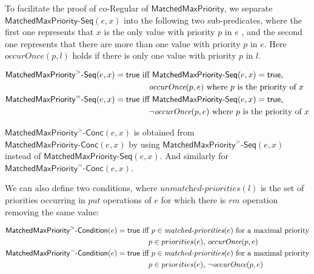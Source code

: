 To facilitate the proof of co-Regular of $\mathsf{MatchedMaxPriority}$, we separate $\mathsf{MatchedMaxPriority\text{-}Seq}(e,x)$ into the following two sub-predicates, where the first one represents that $x$ is the only value with priority $p$ in $e$ , and the second one represents that there are more than one value with priority $p$ in $e$. Here $\textit{occurOnce}(p,l)$ holds if there is only one value with priority $p$ in $l$. 

{\small
\begin{align*}
\mathsf{MatchedMaxPriority}^{>}\mathsf{\text{-}Seq}(e,x)=\mathsf{true} & \mbox{ iff  $\mathsf{MatchedMaxPriority}\mathsf{\text{-}Seq}(e,x)=\mathsf{true}$,} \\
&\hspace{4mm}\mbox{$\textit{occurOnce}(p,e)$ where $p$ is the priority of $x$} \\
\mathsf{MatchedMaxPriority}^{=}\mathsf{\text{-}Seq}(e,x)=\mathsf{true} & \mbox{ iff  $\mathsf{MatchedMaxPriority}\mathsf{\text{-}Seq}(e,x)=\mathsf{true}$,} \\
&\hspace{4mm}\mbox{$\neg\textit{occurOnce}(p,e)$ where $p$ is the priority of $x$} \\
\end{align*}
}

$\mathsf{MatchedMaxPriority}^{>}\mathsf{\text{-}Conc}(e,x)$ is obtained from $\mathsf{MatchedMaxPriority}\mathsf{\text{-}Conc}(e,x)$ by using $\mathsf{MatchedMaxPriority}^{>}\mathsf{\text{-}Seq}(e,x)$ instead of $\mathsf{MatchedMaxPriority\text{-}Seq}(e,x)$. And similarly for $\mathsf{MatchedMaxPriority}^{=}\mathsf{\text{-}Conc}(e,x)$. 

We can also define two conditions, where $\textit{unmatched-priorities}(l)$ is the set of priorities occurring in $\textit{put}$ operations of $e$ for which there is $\textit{rm}$ operation removing the same value: 

{\small
\begin{align*}
\mathsf{MatchedMaxPriority}^{>}\mathsf{\text{-}Condition}(e)=\mathsf{true} & \mbox{ iff $p\in \textit{matched-priorities}(e)$ for a maximal priority} \\
&\hspace{4mm}\mbox{$p\in priorities(e)$, $\textit{occurOnce}(p,e)$} \\
\mathsf{MatchedMaxPriority}^{=}\mathsf{\text{-}Condition}(e)=\mathsf{true} & \mbox{ iff $p\in \textit{matched-priorities}(e)$ for a maximal priority} \\
&\hspace{4mm}\mbox{$p\in priorities(e)$, $\neg\textit{occurOnce}(p,e)$} 
\end{align*}} 

